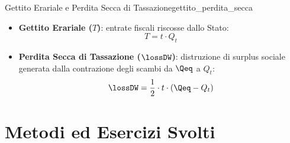 \begin{definizione}{Gettito Erariale e Perdita Secca di Tassazione}{gettito_perdita_secca}
\begin{itemize}
    \item \textbf{Gettito Erariale ($T$)}: entrate fiscali riscosse dallo Stato:
    \begin{equation}
        T = t \cdot Q_t
    \end{equation}
    \item \textbf{Perdita Secca di Tassazione ($\lossDW$)}: distruzione di surplus sociale generata dalla contrazione degli scambi da $\Qeq$ a $Q_t$:
    \begin{equation}
        \lossDW = \frac{1}{2} \cdot t \cdot (\Qeq - Q_t)
    \end{equation}
\end{itemize}
\end{definizione}

\section{Metodi ed Esercizi Svolti}

